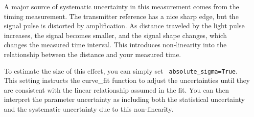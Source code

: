 A major source of systematic uncertainty in this measurement comes
from the timing measurement.  The transmitter reference has a nice
sharp edge, but the signal pulse is distorted by amplification.  As
distance traveled by the light pulse increases, the signal becomes
smaller, and the signal shape changes, which changes the measured time
interval.  This introduces non-linearity into the relationship between
the distance and your measured time.

To estimate the size of this effect, you can simply set {\tt
  absolute{\_}sigma=True}.  This setting instructs the {\rm curve{\_}fit}
function to adjust the uncertainties until they are consistent with
the linear relationship assumed in the fit.  You can then interpret
the parameter uncertainty as including both the statistical
uncertainty and the systematic uncertainty due to this non-linearity.


